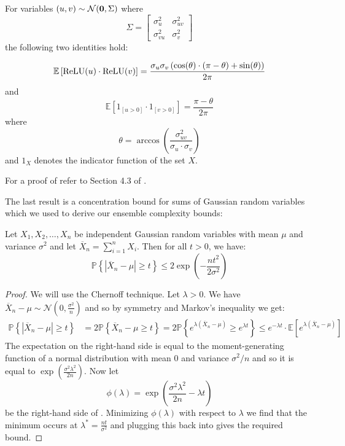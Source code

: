 \begin{lemma}
    \label{lemm:relu_exp}
    For variables $(u, v) \sim \mathcal{N}(\boldsymbol{0}, \Sigma)$ where 
    $$\Sigma = \begin{bmatrix}
        \sigma_u^2 & \sigma_{uv}^2 \\
        \sigma_{vu}^2 & \sigma_v^2
    \end{bmatrix}$$
    the following two identities hold:
    
    $$\mathbb{E}\left[\mathrm{ReLU}(u)\cdot \mathrm{ReLU}(v)\right] = \frac{\sigma_u \sigma_v\left(\cos(\theta)\cdot(\pi - \theta) + \sin(\theta)\right)}{2\pi}$$
    and
    $$\mathbb{E}\left[1_{[u > 0]} \cdot 1_{[v>0]}\right] = \frac{\pi - \theta}{2\pi}$$
    where 
    $$\theta = \arccos\left(\frac{\sigma_{uv}^2}{\sigma_u \cdot \sigma_v}\right)$$ and $1_{X}$ denotes the indicator function of the set $X$.
\end{lemma}

 For a proof of   refer to Section 4.3 of \citet{golikov2022neuraltangentkernelsurvey}.
 
The last result is a concentration bound for sums of Gaussian random variables which we used to derive our ensemble complexity bounds:

\begin{lemma}
\label{lemm:concentration}
    Let $X_1,X_2,\dots,X_n$ be independent Gaussian random variables with mean $\mu$ and variance $\sigma^2$ and let $\overline{X}_n=\sum_{i=1}^n X_i$. Then for all $t>0$, we have:
    $$\mathbb{P}\left\{|\overline{X}_n - \mu| \geq t \right\} \leq 2 \exp\left(- \frac{nt^2}{2\sigma^2}\right)$$
\end{lemma}

\begin{proof}
We will use the Chernoff technique. Let $\lambda > 0$. We have $\overline{X}_n - \mu  \sim \mathcal{N}\left(0, \frac{\sigma^2}{n}\right)$ and so by symmetry and Markov's inequality we get: 
\begin{align}
\label{eq:lambda}
\mathbb{P}\left\{|\overline{X}_n-\mu| \geq t\right\} &= 2\mathbb{P}\left\{\overline{X}_n-\mu \geq t\right\} = 2\mathbb{P}\left\{e^{\lambda(\overline{X}_n-\mu) }\geq e^{\lambda t}\right\} \leq e^{-\lambda t}\cdot \mathbb{E}\left[e^{\lambda(\overline{X}_n-\mu)}\right]
\end{align}
The expectation on the right-hand side is equal to the moment-generating function of a normal distribution with mean $0$ and variance $\sigma^2/n$ and so it is equal to $\exp\left(\frac{\sigma^2 \lambda^2}{2n}\right)$. Now let 
$$\phi(\lambda) = \exp\left(\frac{\sigma^2 \lambda^2}{2n} - \lambda t\right)$$
be the right-hand side of . Minimizing $\phi(\lambda)$ with respect to $\lambda$ we find that the minimum occurs at $\lambda^* = \frac{nt}{\sigma^2}$ and plugging this back into  gives the required bound.
\end{proof}

